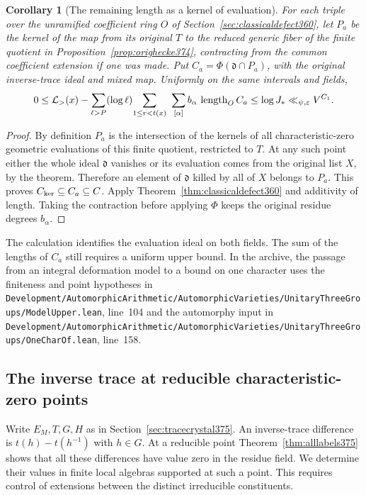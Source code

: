 \documentclass[a4paper,11pt]{article}
\newtheorem{corollary}[proposition]{Corollary}
\theoremstyle{definition}
\theoremstyle{remark}
\newcommand{\len}{\operatorname{length}}\newcommand{\Res}{\operatorname*{Res}}
\newcommand{\srcloc}[2]{{\small\nolinkurl{#1.lean}}, line~#2}
\numberwithin{equation}{section}
\begin{document}
\begin{corollary}[The remaining length as a kernel of evaluation]
\label{cor:componentdefect375}
For each triple over the unramified coefficient ring \(O\)
of Section~\ref{sec:classicaldefect360}, let \(P_a\) be the
kernel of the map from its original \(T\) to the reduced
generic fiber of the finite quotient in
Proposition~\ref{prop:orighecke374}, contracting from the
common coefficient extension if one was made. Put
\(C_a=\Phi(\mathfrak d\cap P_a)\), with the original
inverse-trace ideal and mixed map. Uniformly on the same
intervals and fields,
\[
 0\le \mathcal L_{>}(x)
       -\sum_{\ell>P}(\log\ell)\!
        \sum_{1\le r<t(x)}\ \sum_{[\alpha]}
           b_\alpha\,\len_O C_a
       \le \log J_* \ll_{\psi,\eps}V^{C_1}.
\]
\end{corollary}
\begin{proof}
By definition \(P_a\) is the intersection of the kernels of
all characteristic-zero geometric evaluations of this finite
quotient, restricted to \(T\). At any such point either the
whole ideal \(\mathfrak d\) vanishes or its evaluation comes
from the original list \(X\), by the theorem. Therefore an
element of \(\mathfrak d\) killed by all of \(X\) belongs to
\(P_a\). This proves \(C_{\rm ker}\subseteq C_a\subseteq C\).
Apply Theorem~\ref{thm:classicaldefect360} and additivity of
length. Taking the contraction before applying \(\Phi\) keeps
the original residue degrees \(b_\alpha\).
\end{proof}

The calculation identifies the evaluation ideal on both
fields. The sum of the lengths of \(C_a\) still requires a
uniform upper bound. In the archive, the passage from an
integral deformation model to a bound on one character
uses the finiteness and point hypotheses in
\srcloc{Development/AutomorphicArithmetic/AutomorphicVarieties/UnitaryThreeGroups/ModelUpper}{104}
and the automorphy input in
\srcloc{Development/AutomorphicArithmetic/AutomorphicVarieties/UnitaryThreeGroups/OneCharOf}{158}.


\subsection{The inverse trace at reducible characteristic-zero points}
\label{sec:reduciblefiber376}

Write \(E_M,T,G,H\) as in Section~\ref{sec:tracecrystal375}.
An inverse-trace difference is \(t(h)-t(h^{-1})\) with \(h\in G\).
At a reducible point Theorem~\ref{thm:alllabels375} shows that
all these differences have value zero in the residue field.
We determine their values in finite local algebras supported
at such a point. This requires control of extensions between
the distinct irreducible constituents.
\end{document}
